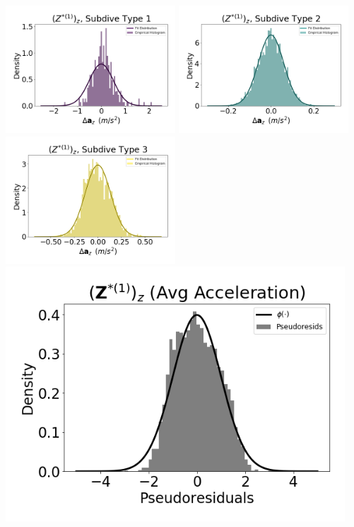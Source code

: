 \documentclass[12pt]{TD-CJS}
\begin{document}
\newpage

\includegraphics[width=2.5in]{../Plots/CarHHMM1_empirical_hist_Az_0.png}
\includegraphics[width=2.5in]{../Plots/CarHHMM1_empirical_hist_Az_1.png}
\includegraphics[width=2.5in]{../Plots/CarHHMM1_empirical_hist_Az_2.png}
\includegraphics[width=5in]{../Plots/CarHHMM1_psedoresids_Az.png}
\end{document}

